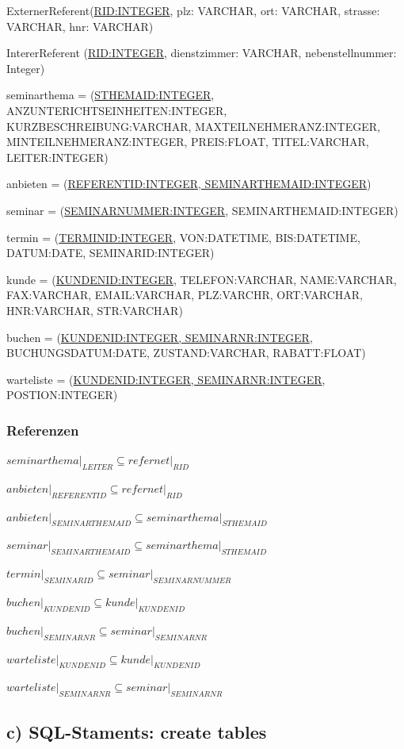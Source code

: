 \documentclass[10pt,a4paper]{report}
\begin{document}
ExternerReferent(\underline{RID:INTEGER}, plz: VARCHAR, ort: VARCHAR, strasse: VARCHAR, hnr: VARCHAR)

IntererReferent (\underline{RID:INTEGER}, dienstzimmer: VARCHAR, nebenstellnummer: Integer) 

seminarthema = (\underline{STHEMAID:INTEGER}, ANZUNTERICHTSEINHEITEN:INTEGER, KURZBESCHREIBUNG:VARCHAR, MAXTEILNEHMERANZ:INTEGER, MINTEILNEHMERANZ:INTEGER, PREIS:FLOAT, TITEL:VARCHAR, LEITER:INTEGER)

anbieten = (\underline{REFERENTID:INTEGER, SEMINARTHEMAID:INTEGER})

seminar = (\underline{SEMINARNUMMER:INTEGER}, SEMINARTHEMAID:INTEGER)

termin = (\underline{TERMINID:INTEGER}, VON:DATETIME, BIS:DATETIME, DATUM:DATE, SEMINARID:INTEGER)

kunde   = (\underline{KUNDENID:INTEGER}, TELEFON:VARCHAR, NAME:VARCHAR, FAX:VARCHAR, EMAIL:VARCHAR, PLZ:VARCHR, ORT:VARCHAR, HNR:VARCHAR, STR:VARCHAR)

buchen = (\underline{KUNDENID:INTEGER, SEMINARNR:INTEGER}, BUCHUNGSDATUM:DATE, ZUSTAND:VARCHAR, RABATT:FLOAT)

warteliste = (\underline{KUNDENID:INTEGER, SEMINARNR:INTEGER}, POSTION:INTEGER)

\subsubsection{Referenzen}
$seminarthema\vert_{LEITER} \subseteq refernet\vert_{RID}$

$anbieten\vert_{REFERENTID} \subseteq refernet\vert_{RID}$

$anbieten\vert_{SEMINARTHEMAID} \subseteq seminarthema\vert_{STHEMAID}$

$seminar\vert_{SEMINARTHEMAID} \subseteq seminarthema\vert_{STHEMAID}$

$termin\vert_{SEMINARID} \subseteq seminar\vert_{SEMINARNUMMER}$

$buchen\vert_{KUNDENID} \subseteq kunde\vert_{KUNDENID}$

$buchen\vert_{SEMINARNR} \subseteq seminar\vert_{SEMINARNR}$

$warteliste\vert_{KUNDENID} \subseteq kunde\vert_{KUNDENID}$

$warteliste\vert_{SEMINARNR} \subseteq seminar\vert_{SEMINARNR}$

\subsection{c) SQL-Staments: create tables}
\end{document}
